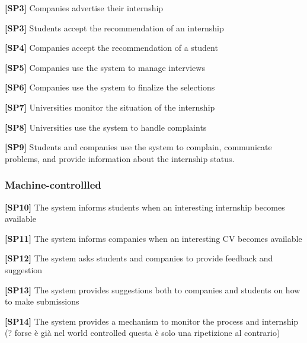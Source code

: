\textbf{[SP3]} Companies advertise their internship

\textbf{[SP3]} Students accept the recommendation of an internship

\textbf{[SP4]} Companies accept the recommendation of a student

\textbf{[SP5]} Companies use the system to manage interviews

\textbf{[SP6]} Companies use the system to finalize the selections

\textbf{[SP7]} Universities monitor the situation of the internship

\textbf{[SP8]} Universities use the system to handle complaints

\textbf{[SP9] }Students and companies use the system to complain, communicate problems, and provide information about the internship status.

\subsubsection{Machine-controllled}
\textbf{[SP10]} The system informs students when an interesting internship becomes available

\textbf{[SP11]} The system informs companies when an interesting CV becomes available

\textbf{[SP12]} The system asks students and companies to provide feedback and suggestion

\textbf{[SP13]} The system provides suggestions both to companies and students on how to make submissions

\textbf{[SP14] }The system provides a mechanism to monitor the process and internship (? forse è già nel world controlled questa è solo una ripetizione al contrario)


